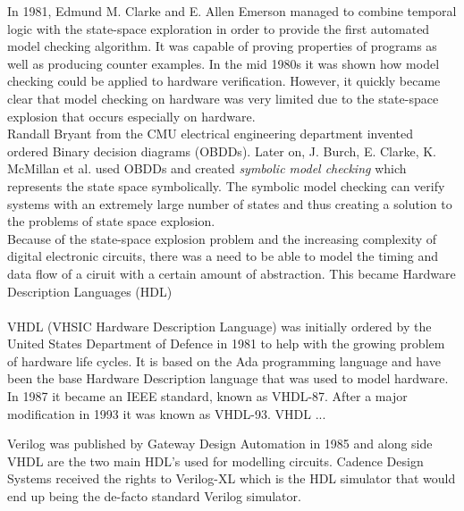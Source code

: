\documentclass[a4paper]{report}
\begin{document}
In 1981, Edmund M. Clarke and E. Allen Emerson managed to combine temporal logic with the state-space exploration in order to provide the first automated model checking algorithm\cite{Clarke1981}. It was capable of proving properties of programs as well as producing counter examples. 
In the mid 1980s it was shown how model checking could be applied to hardware verification. However, it quickly became clear that model checking on hardware was very limited due to the state-space explosion that occurs especially on hardware. \\ 
Randall Bryant from the CMU electrical engineering department invented ordered Binary decision diagrams (OBDDs). Later on, J. Burch, E. Clarke, K. McMillan et al.\cite{Burch1992} used OBDDs and created \textit{symbolic model checking} which represents the state space symbolically. The symbolic model checking can verify systems with an extremely large number of states and thus creating a solution to the problems of state space explosion.\\
Because of the state-space explosion problem and the increasing complexity of digital electronic circuits, there was a need to be able to model the timing and data flow of a ciruit with a certain amount of abstraction. This became Hardware Description Languages (HDL) \\\\
VHDL (VHSIC Hardware Description Language) was initially ordered by the United States Department of Defence in 1981 to help with the growing problem of hardware life cycles. It is based on the Ada programming language and have been the base Hardware Description language that was used to model hardware. In 1987 it became an IEEE standard, known as VHDL-87. After a major modification in 1993 it was known as VHDL-93. VHDL ... 

Verilog was published by Gateway Design Automation in 1985 and along side VHDL are the two main HDL's used for modelling circuits. Cadence Design Systems received the rights to Verilog-XL which is the HDL simulator that would end up being the de-facto standard Verilog simulator.

%
\end{document}
